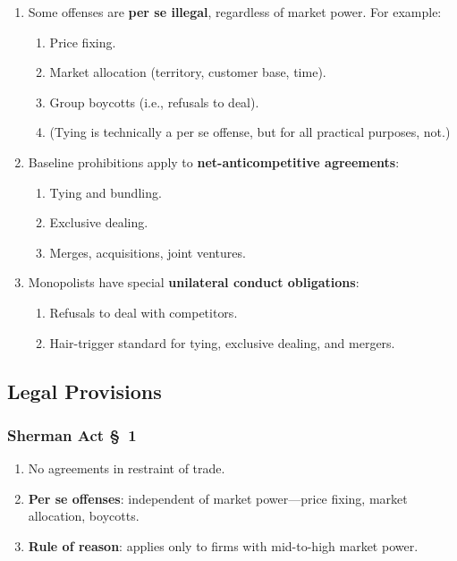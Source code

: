 \begin{enumerate}
    \item Some offenses are \textbf{per se illegal}, regardless of market power.  
    For example:
    \begin{enumerate}
        \item Price fixing.
        \item Market allocation (territory, customer base, time).
        \item Group boycotts (i.e., refusals to deal).
        \item (Tying is technically a per se offense, but for all practical 
        purposes, not.)
    \end{enumerate}
    \item Baseline prohibitions apply to \textbf{net-anticompetitive 
    agreements}:
    \begin{enumerate}
        \item Tying and bundling.
        \item Exclusive dealing.
        \item Merges, acquisitions, joint ventures.
    \end{enumerate}
    \item Monopolists have special \textbf{unilateral conduct obligations}:
    \begin{enumerate}
        \item Refusals to deal with competitors.
        \item Hair-trigger standard for tying, exclusive dealing, and mergers.
    \end{enumerate}
\end{enumerate}

\subsection{Legal Provisions}

\subsubsection{Sherman Act \S\ 1}

\begin{enumerate}
    \item No agreements in restraint of trade.
    \item \textbf{Per se offenses}: independent of market power---price fixing, 
    market allocation, boycotts.
    \item \textbf{Rule of reason}: applies only to firms with mid-to-high market 
    power.
\end{enumerate}

